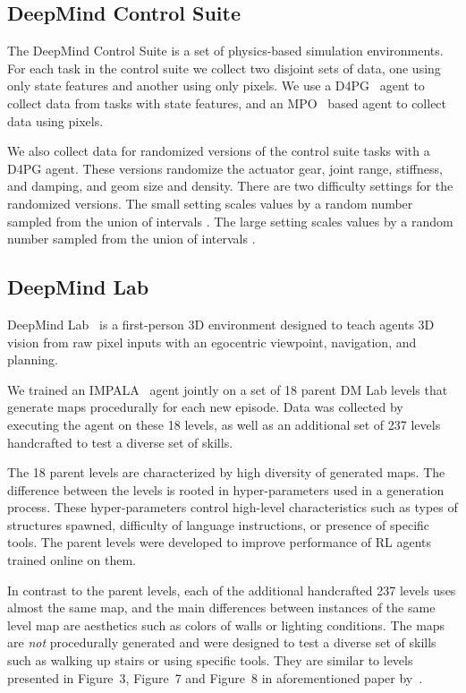 \documentclass[10pt]{article} \usepackage[accepted]{tmlr}
\begin{document}
\subsection{DeepMind Control Suite}
\vskip 0.2cm
The DeepMind Control Suite \citep{tunyasuvunakool2020dmcontrol, tassa2018deepmind} is a set of physics-based simulation environments. For each task in the control suite we collect two disjoint sets of data, one using only state features and another using only pixels.
We use a D4PG~\citep{barth2018distributed} agent to collect data from tasks with state features, and an MPO~\citep{abdolmaleki2018maximum} based agent to collect data using pixels.

We also collect data for randomized versions of the control suite tasks with a D4PG agent. These versions randomize the actuator gear, joint range, stiffness, and damping, and geom size and density.
There are two difficulty settings for the randomized versions. The small setting scales values by a random number sampled from the union of intervals .
The large setting scales values by a random number sampled from the union of intervals .
\vskip 0.4cm  \subsection{DeepMind Lab}
\vskip 0.2cm
DeepMind Lab~\citep{beattie2016deepmind} is a first-person 3D environment designed to teach agents
3D vision from raw pixel inputs with an egocentric viewpoint, navigation, and planning.


We trained an IMPALA~\citep{espeholt2018impala} agent jointly on a set of 18 parent DM Lab levels that generate maps procedurally for each new episode.
Data was collected by executing the agent on these 18 levels, as well as an additional set of 237 levels handcrafted to test a diverse set of skills.


The 18 parent levels are characterized by high diversity of generated maps.
The difference between the levels is rooted in hyper-parameters used in a generation process.
These hyper-parameters control high-level characteristics such as types of structures spawned, difficulty of language instructions, or presence of specific tools.
The parent levels were developed to improve performance of RL agents trained online on them.


In contrast to the parent levels, each of the additional handcrafted 237 levels uses almost the same map, and the main differences between instances of the same level map are aesthetics such as colors of walls or lighting conditions.
The maps are \emph{not} procedurally generated and were designed to test a diverse set of skills such as walking up stairs or using specific tools.
They are similar to levels presented in Figure~3, Figure~7 and Figure~8 in aforementioned paper by~\citet{beattie2016deepmind}.
\end{document}
